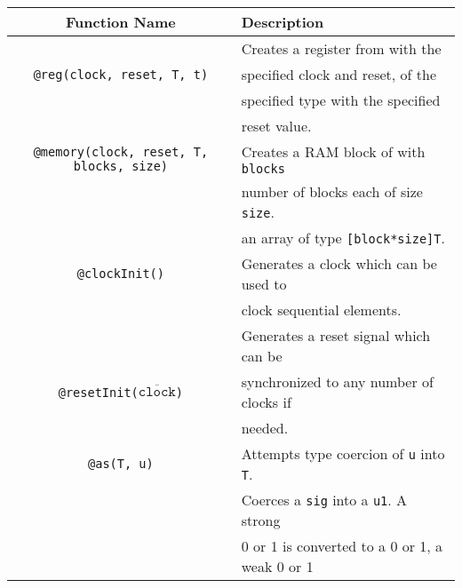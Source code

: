 \documentclass[10pt]{article}
\begin{document}
\begin{table}[H]
	\centering
	\begin{tabular}{c|l}
		Function Name                                         & Description                                       \\
		\hline
		                                                      & Creates a register from with the                  \\
		\verb|@reg(clock, reset, T, t)|                       & specified clock and reset, of the                 \\
		                                                      & specified type with the specified                 \\
		                                                      & reset value.                                      \\
		\hline
		\verb|@memory(clock, reset, T, blocks, size)|         & Creates a RAM block of with \verb|blocks|         \\
		                                                      & number of blocks each of size \verb|size|.        \\
		                                                      & an array of type \verb|[block*size]T|.            \\
		\hline
		\verb|@clockInit()|                                   & Generates a clock which can be used to            \\
		                                                      & clock sequential elements.                        \\
		\hline
		                                                      & Generates a reset signal which can be             \\
		\verb|@resetInit(|$\overline{\texttt{clock}}$\verb|)| & synchronized to any number of clocks if           \\
		                                                      & needed.                                           \\
		\hline
		\verb|@as(T, u)|                                      & Attempts type coercion of \verb|u| into \verb|T|. \\
		\hline
		                                                      & Coerces a \verb|sig| into a \verb|u1|. A strong   \\
		                                                      & 0 or 1 is converted to a 0 or 1, a weak 0 or 1    \\

\end{tabular}
\end{table}
\end{document}
